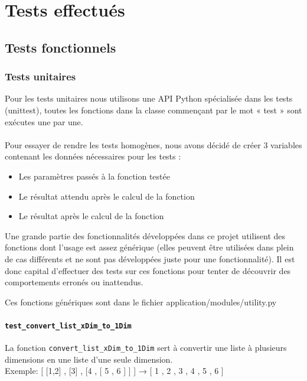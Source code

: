 \documentclass[16pts]{report}
\begin{document}
\chapter{Tests effectués}
\label{cha:Tests}
    \section{Tests fonctionnels}
    \label{sec:Tests fonctionnels}

\subsection{Tests unitaires}

Pour les tests unitaires nous utilisons une API Python spécialisée dans les 
tests (unittest), toutes les fonctions dans la classe 
commençant par le mot « test » sont exécutes une par une.\\
\\
Pour essayer de rendre les tests homogènes, nous avons décidé de créer 3 
variables contenant les données nécessaires pour les tests :\\

\begin{itemize}
    \item Les paramètres passés à la fonction testée
    \item Le résultat attendu après le calcul de la fonction
    \item Le résultat après le calcul de la fonction
\end{itemize}

Une grande partie des fonctionnalités développées dans ce projet utilisent
des fonctions dont l'usage est assez générique (elles peuvent être utilisées
dans plein de cas différents et ne sont pas développées juste pour une 
fonctionnalité). Il est donc capital d'effectuer des tests sur ces fonctions
pour tenter de découvrir des comportements erronés ou inattendus.

Ces fonctions génériques sont dans le fichier application/modules/utility.py

\subsubsection{\texttt{test\_convert\_list\_xDim\_to\_1Dim}}

La fonction \verb|convert_list_xDim_to_1Dim| sert à 
convertir une liste à plusieurs dimensions en une liste d'une seule dimension.
\\
Exemple: [ [1,2] , [3] , [4 , [ 5 , 6 ] ] ] → [ 1 , 2 , 3 , 4 , 5 , 6 ]\\
\end{document}
